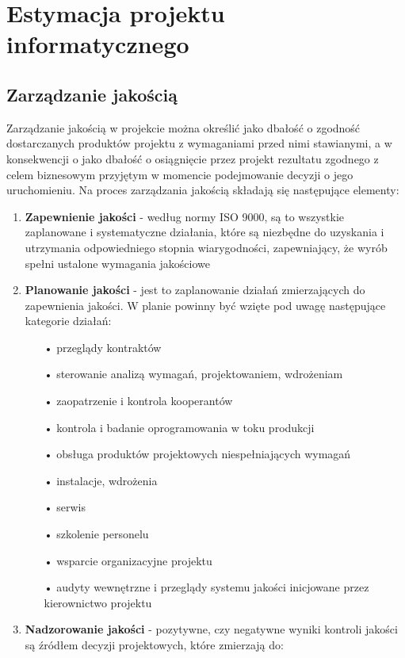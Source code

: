 \chapter{Estymacja projektu informatycznego}
\section{Zarządzanie jakością}
Zarządzanie jakością w projekcie można określić jako dbałość o zgodność dostarczanych produktów projektu z wymaganiami przed nimi stawianymi, a w konsekwencji o jako dbałość o osiągnięcie przez projekt rezultatu zgodnego z celem biznesowym przyjętym w momencie podejmowanie decyzji o jego uruchomieniu.\newline
Na proces zarządzania jakością składają się następujące elementy:
\begin{enumerate}
\item \textbf{Zapewnienie jakości} - według normy ISO 9000, są to wszystkie zaplanowane i systematyczne działania, które są niezbędne do uzyskania i utrzymania odpowiedniego stopnia wiarygodności, zapewniający, że wyrób spełni ustalone wymagania jakościowe
\item \textbf{Planowanie jakości} - jest to zaplanowanie działań zmierzających do zapewnienia jakości. W planie powinny być wzięte pod uwagę następujące kategorie działań:
\begin{itemize}
\item[•] przeglądy kontraktów
\item[•] sterowanie analizą wymagań, projektowaniem, wdrożeniam
\item[•] zaopatrzenie i kontrola kooperantów
\item[•] kontrola i badanie oprogramowania w toku produkcji
\item[•] obsługa produktów projektowych niespełniających wymagań
\item[•] instalacje, wdrożenia
\item[•] serwis
\item[•] szkolenie personelu
\item[•] wsparcie organizacyjne projektu
\item[•] audyty wewnętrzne i przeglądy systemu jakości inicjowane przez kierownictwo projektu
\end{itemize}
\item \textbf{Nadzorowanie jakości} - pozytywne, czy negatywne wyniki kontroli jakości są źródłem decyzji projektowych, które zmierzają do:
\begin{itemize}

\end{itemize}
\end{enumerate}
